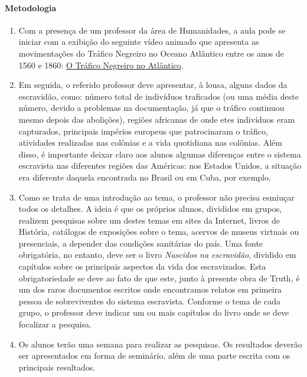 \documentclass[11pt]{extarticle}
\begin{document}
\paragraph{Metodologia}

   \begin{enumerate}
    \item
    Com a presença de um professor da área de Humanidades, a aula pode se iniciar 
    com a exibição do seguinte vídeo animado
    que apresenta as movimentações do Tráfico Negreiro no Oceano Atlântico
    entre os anos de 1560 e 1860:
    \href{https://www.youtube.com/watch?v=aMyg2Cmukmo}{O Tráfico Negreiro no Atlântico}.


    \item
    Em seguida, o referido professor deve apresentar, à lousa, alguns dados da escravidão,
    como: número total de indivíduos traficados (ou uma média deste número, devido a problemas
    na documentação, já que o tráfico continuou mesmo depois das abolições), regiões africanas
    de onde etes indivíduos eram capturados, principais impérios europeus que patrocinaram
    o tráfico, atividades realizadas nas colônias e a vida quotidiana nas colônias. Além disso, 
    é importante deixar claro aos alunos algumas diferenças entre o sistema escravista
    nas diferentes regiões das Américas: nos Estados Unidos, a situação era diferente daquela
    encontrada no Brasil ou em Cuba, por exemplo. 

    \item
    Como se trata de uma introdução ao tema, o professor não precisa esmiuçar todos os detalhes.
    A ideia é que os próprios alunos, divididos em grupos, realizem pesquisas sobre um destes
    temas em sites da Internet, livros de História, catálogos de exposições sobre o tema,
    acervos de museus virtuais ou presenciais, a depender das condições sanitárias do país. 
    Uma fonte obrigatória, no entanto, deve ser o livro \emph{Nascidos na escravidão}, dividido
    em capítulos sobre os principais aspectos da vida dos escravizados. Esta obrigatoriedade
    se deve ao fato de que este, junto à presente obra de Truth, é um dos raros
    documentos escritos onde encontramos relatos em primeira pessoa de 
    sobreviventes do sistema escravista. Conforme o tema de cada grupo, o professor deve
    indicar um ou mais capítulos do livro onde se deve focalizar a pesquisa.

    \item
    Os alunos terão uma semana para realizar as pesquisas. Os resultados deverão ser apresentados 
    em forma de seminário, além de uma parte escrita com os principais resultados.

   \end{enumerate}
\end{document}
